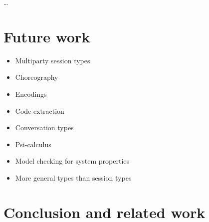 \documentclass{article}
\begin{document}
\dots


\section{Future work}
\begin{itemize}
\item Multiparty session types
\item Choreography
\item Encodings
\item Code extraction
\item Conversation types
\item Psi-calculus
\item Model checking for system properties
\item More general types than session types
\end{itemize}

\section{Conclusion and related work} \label{sec:conclusion}




\label{lastpage01}
\end{document}
